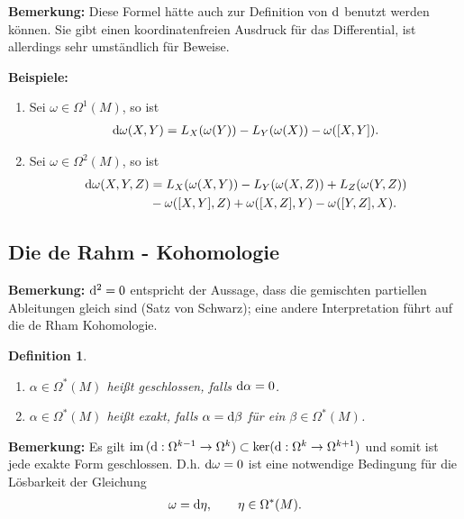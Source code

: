 \documentclass[12pt,a4paper]{article}
\def\im{\mathrm{im}\,}
\newtheorem{Definition}[Lemma]{Definition}
\begin{document}
{\bf Bemerkung:}
Diese Formel h\"atte auch zur Definition von $\mathrm{d}$ benutzt werden k\"onnen.
Sie gibt einen koordinatenfreien Ausdruck f\"ur das Differential, ist
allerdings sehr umst\"andlich f\"ur Beweise.

\bigskip

{\bf Beispiele:}
\begin{enumerate}
  \item Sei $\omega\in \Omega^1(M)$, so ist
\begin{align*}
\mathrm{d}\omega(X,Y) = L_X(\omega(Y))-L_Y(\omega(X))-\omega([X,Y]).
\end{align*}
\item Sei $\omega\in \Omega^2(M)$, so ist
\begin{align*}
\mathrm{d}\omega(X,Y,Z) &= L_X(\omega(X,Y)) - L_Y(\omega(X,Z)) + L_Z(\omega(Y,Z)) \\ &-
\omega([X,Y],Z) + \omega([X,Z],Y) - \omega([Y,Z],X).
\end{align*}
\end{enumerate}

\subsection{Die de Rahm - Kohomologie}

{\bf Bemerkung:}
$\mathrm{d}^2 = 0$ entspricht der Aussage, dass die gemischten partiellen
Ableitungen gleich sind (Satz von Schwarz); eine andere Interpretation f\"uhrt
auf die de Rham Kohomologie.

\bigskip

\begin{Definition}
\begin{enumerate}
  \item $\alpha\in\Omega^*(M)$ hei\ss{}t \emph{geschlossen}, falls $\mathrm{d}\alpha =
  0$.
  \item $\alpha\in \Omega^*(M)$ hei\ss{}t \emph{exakt}, falls $\alpha =\mathrm{d}\beta$
  f\"ur ein $\beta\in\Omega^*(M)$.
\end{enumerate}
\end{Definition}

\bigskip

{\bf Bemerkung:} Es gilt $\im (\diffd: \Omega^{k-1}\to \Omega^k) \subset \ker
(\diffd : \Omega^{k}\to \Omega^{k+1})$ und somit ist jede exakte Form geschlossen.
D.h. $\mathrm{d}\omega = 0$ ist eine notwendige Bedingung f\"ur die L\"osbarkeit der Gleichung
\begin{align*}
\omega = \mathrm{d}\eta,\qquad \eta\in\Omega^*(M).
\end{align*}
\end{document}

